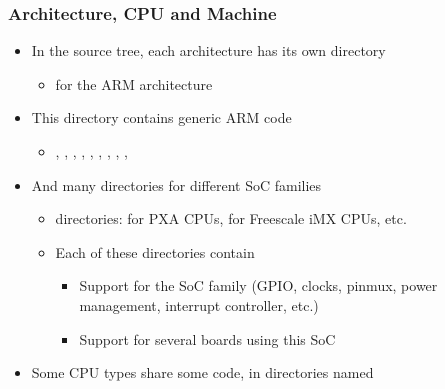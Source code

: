 \begin{frame}
  \frametitle{Architecture, CPU and Machine}
  \begin{itemize}
  \item In the source tree, each architecture has its own directory
    \begin{itemize}
    \item {} for the ARM architecture
    \end{itemize}
  \item This directory contains generic ARM code
    \begin{itemize}
    \item {}, , , ,
      , , , ,
      , 
    \end{itemize}
  \item And many directories for different SoC families
    \begin{itemize}
    \item {} directories:  for PXA CPUs,
       for Freescale iMX CPUs, etc.
    \item Each of these directories contain
      \begin{itemize}
      \item Support for the SoC family (GPIO, clocks, pinmux, power
        management, interrupt controller, etc.)
      \item Support for several boards using this SoC
      \end{itemize}
    \end{itemize}
  \item Some CPU types share some code, in directories named
  \end{itemize}
\end{frame}

